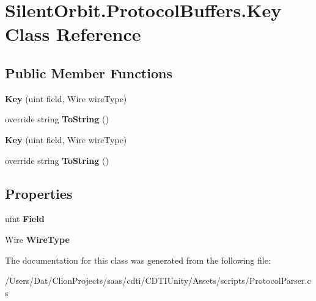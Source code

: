 \hypertarget{class_silent_orbit_1_1_protocol_buffers_1_1_key}{}\section{Silent\+Orbit.\+Protocol\+Buffers.\+Key Class Reference}
\label{class_silent_orbit_1_1_protocol_buffers_1_1_key}
\subsection*{Public Member Functions}
\begin{DoxyCompactItemize}
\item 
{\bfseries Key} (uint field, Wire wire\+Type)\hypertarget{class_silent_orbit_1_1_protocol_buffers_1_1_key_afec25f3e95b45ea1637725a855e81360}{}\label{class_silent_orbit_1_1_protocol_buffers_1_1_key_afec25f3e95b45ea1637725a855e81360}

\item 
override string {\bfseries To\+String} ()\hypertarget{class_silent_orbit_1_1_protocol_buffers_1_1_key_ae46395a4028f035c19a07caa680f1ad0}{}\label{class_silent_orbit_1_1_protocol_buffers_1_1_key_ae46395a4028f035c19a07caa680f1ad0}

\item 
{\bfseries Key} (uint field, Wire wire\+Type)\hypertarget{class_silent_orbit_1_1_protocol_buffers_1_1_key_afec25f3e95b45ea1637725a855e81360}{}\label{class_silent_orbit_1_1_protocol_buffers_1_1_key_afec25f3e95b45ea1637725a855e81360}

\item 
override string {\bfseries To\+String} ()\hypertarget{class_silent_orbit_1_1_protocol_buffers_1_1_key_ae46395a4028f035c19a07caa680f1ad0}{}\label{class_silent_orbit_1_1_protocol_buffers_1_1_key_ae46395a4028f035c19a07caa680f1ad0}

\end{DoxyCompactItemize}
\subsection*{Properties}
\begin{DoxyCompactItemize}
\item 
uint {\bfseries Field}\hypertarget{class_silent_orbit_1_1_protocol_buffers_1_1_key_a633f5ab095f7ed07ae3767d719834747}{}\label{class_silent_orbit_1_1_protocol_buffers_1_1_key_a633f5ab095f7ed07ae3767d719834747}

\item 
Wire {\bfseries Wire\+Type}\hypertarget{class_silent_orbit_1_1_protocol_buffers_1_1_key_a0080c3bd74cda7b92d7066cdeb25f819}{}\label{class_silent_orbit_1_1_protocol_buffers_1_1_key_a0080c3bd74cda7b92d7066cdeb25f819}

\end{DoxyCompactItemize}


The documentation for this class was generated from the following file\+:\begin{DoxyCompactItemize}
\item 
/\+Users/\+Dat/\+Clion\+Projects/saas/cdti/\+C\+D\+T\+I\+Unity/\+Assets/scripts/Protocol\+Parser.\+cs\end{DoxyCompactItemize}
